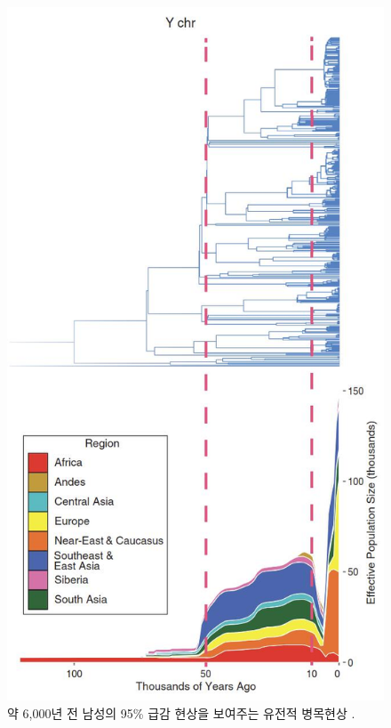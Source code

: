 \documentclass[10pt,twocolumn,letterpaper]{article}
\begin{document}
\begin{figure}[t]
\begin{center}
   \includegraphics[width=1\linewidth]{bottleneck.jpg}
\end{center}
   \caption{약 6,000년 전 남성의 95\% 급감 현상을 보여주는 유전적 병목현상 \cite{62}.}
\label{fig:10}
\label{fig:onecol}
\end{figure}
\end{document}
